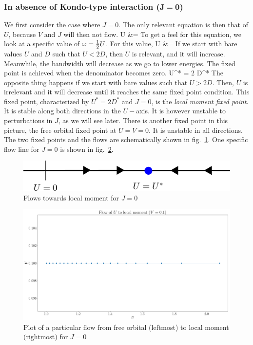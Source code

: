 \documentclass[14pt]{extarticle}
\numberwithin{equation}{section}
\begin{document}
{\subsubsection*{In absence of Kondo-type interaction (\(\pmb{J=0}\))}
We first consider the case where \(J=0\). The only relevant equation is then that of \(U\), because \(V\) and \(J\) will then not flow.
\beq
\Delta U &= 
\eeq
To get a feel for this equation, we look at a specific value of \(\omega = \frac{1}{2} U\). For this value,
\beq
\Delta U &= 
\eeq
If we start with bare values \(U\) and \(D\) such that \(U <  2D\), then \(U\) is relevant, and it will increase. Meanwhile, the bandwidth will decrease as we go to lower energies. The fixed point is achieved when the denominator becomes zero.
\beq
U^* = 2 D^*
\eeq
The opposite thing happens if we start with bare values such that  \(U >  2D\). Then, \(U\) is irrelevant and it will decrease until it reaches the same fixed point condition. This fixed point, characterized by \(U^* = 2 D^*\) and \(J=0\), is the \textit{local moment fixed point}. It is stable along both directions in the \(U-\)axis. It is however unstable to perturbations in \(J\), as we will see later.
\pb
There is another fixed point in this picture, the free orbital fixed point at \(U=V=0\). It is unstable in all directions. The two fixed points and the flows are schematically shown in fig.~\ref{lmflow}. One specific flow line for \(J=0\) is shown in fig.~\ref{fo2lm}.
\begin{figure}
\centering
\includegraphics[scale=0.5]{lmflow.png}
\caption{Flows towards local moment for \(J=0\)}
\label{lmflow}
\end{figure}
\begin{figure}
\centering
\includegraphics[scale=0.3]{fo2lm.png}
\caption{Plot of a particular flow from free orbital (leftmost) to local moment (rightmost) for \(J=0\)}
\label{fo2lm}
\end{figure}
}
\end{document}
